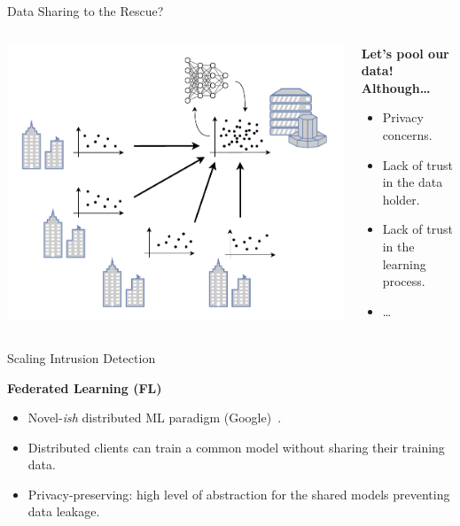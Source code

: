 \begin{frame}{Data Sharing to the Rescue?}
\begin{columns}
  \begin{column}{0.5\textwidth}
    \centering
    \includegraphics[width=\linewidth]{figures/intro/collab.pdf}
  \end{column}
  \begin{column}{0.5\textwidth}
    \textbf{Let's pool our data!}\pause{} \textbf{Although\dots}
    \begin{itemize}
      \item Privacy concerns.
      \item Lack of trust in the data holder.
      \item Lack of trust in the learning process.
      \item \dots
    \end{itemize}
  \end{column}
\end{columns}
\end{frame}


\begin{frame}{Scaling Intrusion Detection}

  \textbf{Federated Learning (FL)}
  
  \begin{itemize}[<+->]
    \item Novel-\emph{ish} distributed ML paradigm (Google)~\autocite{mcmahan_Communicationefficientlearningdeep_2017}.
    \item Distributed clients can train a common model without sharing their training data.
    \item \alert{Privacy-preserving}: high level of abstraction for the shared models preventing data leakage.
  \end{itemize}

\end{frame}


